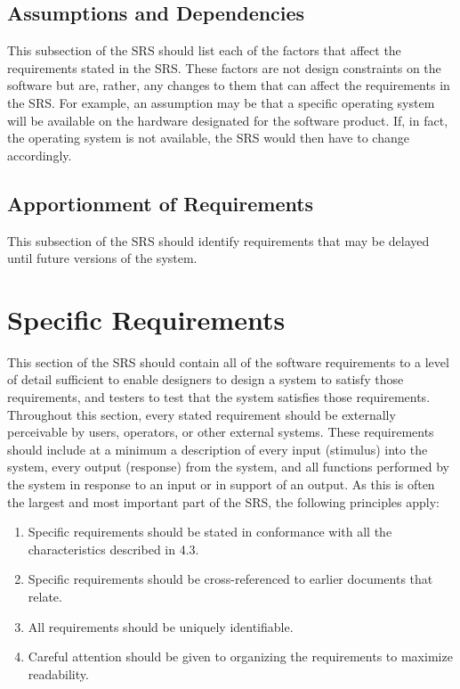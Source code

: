 \documentclass[draftclsnofoot,onecolumn,10pt]{IEEEtran}
\begin{document}
\begin{enumerate}
\subsection{Assumptions and Dependencies}
This subsection of the SRS should list each of the factors that affect the
requirements stated in the SRS. These factors are not design constraints on the
software but are, rather, any changes to them that can affect the requirements
in the SRS. For example, an assumption may be that a specific operating system
will be available on the hardware designated for the software product. If, in
fact, the operating system is not available, the SRS would then have to change
accordingly.

\subsection{Apportionment of Requirements}
This subsection of the SRS should identify requirements that may be delayed
until future versions of the system.

\section{Specific Requirements}
This section of the SRS should contain all of the software requirements to a
level of detail sufficient to enable designers to design a system to satisfy
those requirements, and testers to test that the system satisfies those
requirements. Throughout this section, every stated requirement should be
externally perceivable by users, operators, or other external systems. These
requirements should include at a minimum a description of every input (stimulus)
into the system, every output (response) from the system, and all functions
performed by the system in response to an input or in support of an output. As
this is often the largest and most important part of the SRS, the following
principles apply:
\begin{enumerate}
	\item Specific requirements should be stated in conformance with all the
		characteristics described in 4.3.
	\item Specific requirements should be cross-referenced to earlier documents
		that relate.
	\item All requirements should be uniquely identifiable.
	\item Careful attention should be given to organizing the requirements to
		maximize readability.
\end{enumerate}


\end{enumerate}
\end{document}
